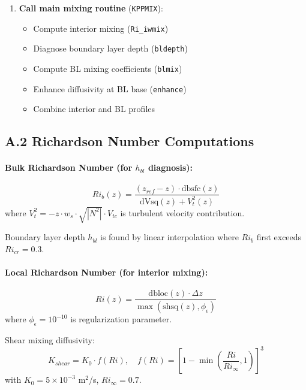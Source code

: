 \documentclass[11pt, a4paper]{article}
\begin{document}
\begin{enumerate}
    \item \textbf{Call main mixing routine} (\texttt{KPPMIX}):
    \begin{itemize}
        \item Compute interior mixing (\texttt{Ri\_iwmix})
        \item Diagnose boundary layer depth (\texttt{bldepth})
        \item Compute BL mixing coefficients (\texttt{blmix})
        \item Enhance diffusivity at BL base (\texttt{enhance})
        \item Combine interior and BL profiles
    \end{itemize}
\end{enumerate}

\subsection*{A.2 Richardson Number Computations}

\paragraph{Bulk Richardson Number (for $h_{bl}$ diagnosis):}
\begin{equation}
Ri_b(z) = \frac{(z_{ref} - z) \cdot \text{dbsfc}(z)}{\text{dVsq}(z) + V_t^2(z)}
\end{equation}
where $V_t^2 = -z \cdot w_s \cdot \sqrt{|N^2|} \cdot V_{tc}$ is turbulent velocity contribution.

Boundary layer depth $h_{bl}$ is found by linear interpolation where $Ri_b$ first exceeds $Ri_{cr} = 0.3$.

\paragraph{Local Richardson Number (for interior mixing):}
\begin{equation}
Ri(z) = \frac{\text{dbloc}(z) \cdot \Delta z}{\max(\text{shsq}(z), \phi_{\epsilon})}
\end{equation}
where $\phi_{\epsilon} = 10^{-10}$ is regularization parameter.

Shear mixing diffusivity:
\begin{equation}
K_{shear} = K_0 \cdot f(Ri), \quad f(Ri) = \left[1 - \min\left(\frac{Ri}{Ri_\infty}, 1\right)\right]^3
\end{equation}
with $K_0 = 5 \times 10^{-3}$ m$^2$/s, $Ri_\infty = 0.7$.
\end{document}
